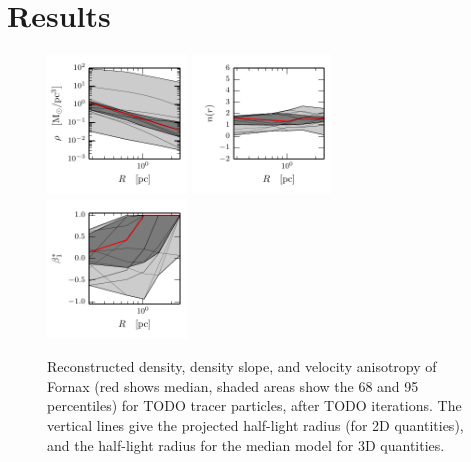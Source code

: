 \section{Results}\label{sec:results}

\begin{figure}
    \begin{center}
        \includegraphics[width=0.33\textwidth]{fig/fornax/prof_rho_0}
        \includegraphics[width=0.33\textwidth]{fig/fornax/prof_nr_0}
        \includegraphics[width=0.33\textwidth]{fig/fornax/prof_betastar_1}
        \caption{Reconstructed density, density slope, and velocity
          anisotropy of Fornax (red shows median, shaded areas
          show the 68 and 95 percentiles) for TODO tracer particles, after
          TODO iterations. The vertical lines give the projected
          half-light radius (for 2D quantities), and the half-light
          radius for the median model for 3D quantities.}
        \label{fig:fornax}
    \end{center}
\end{figure}




